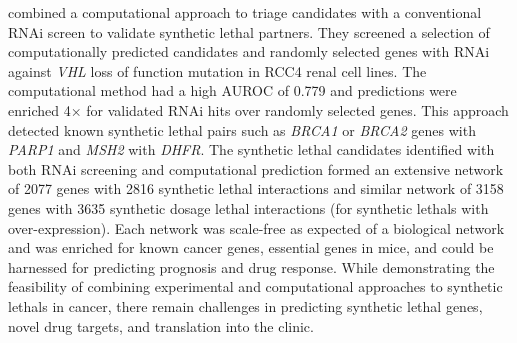 \citet{Jerby2014} combined a computational approach to triage candidates with a conventional \gls{RNAi} screen to validate \gls{synthetic lethal} partners. They screened a selection of computationally predicted candidates and randomly selected genes with \gls{RNAi} against \textit{VHL} loss of function \gls{mutation} in RCC4 renal cell lines. The computational method had a high \gls{AUROC} of 0.779 and predictions were enriched 4$\times$ for validated \gls{RNAi} hits over randomly selected genes. This approach detected known \gls{synthetic lethal} pairs such as \textit{BRCA1} or \textit{BRCA2} genes with \textit{PARP1} and \textit{MSH2} with \textit{DHFR}. The \gls{synthetic lethal} candidates identified with both \gls{RNAi} screening and computational prediction formed an extensive network of 2077 genes with 2816 \gls{synthetic lethal} interactions and similar network of 3158 genes with 3635 \gls{synthetic dosage lethal} interactions (for \glspl{synthetic lethal} with over-expression). Each network was \gls{scale-free} as expected of a biological network and was enriched for known \glspl{cancer gene}, \gls{essential} genes in mice, and could be harnessed for predicting prognosis and drug response. While demonstrating the feasibility of combining experimental and computational approaches to \glspl{synthetic lethal} in cancer, there remain challenges in predicting \gls{synthetic lethal} genes, novel drug targets, and translation into the clinic.  

